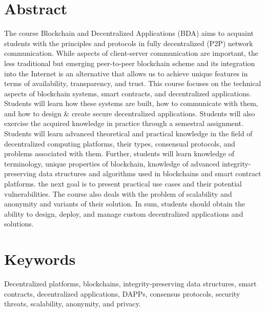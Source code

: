 \section*{Abstract}
The course Blockchain and Decentralized Applications (BDA) aims to acquaint students with the principles and protocols in fully decentralized (P2P) network communication. While aspects of client-server communication are important, the less traditional but emerging peer-to-peer blockchain scheme and its integration into the Internet is an alternative that allows us to achieve unique features in terms of availability, transparency, and trust. This course focuses on the technical aspects of blockchain systems, smart contracts, and decentralized applications. Students will learn how these systems are built, how to communicate with them, and how to design \& create secure decentralized applications. Students will also exercise the acquired knowledge in practice through a semestral assignment.
Students will learn advanced theoretical and practical knowledge in the field of decentralized computing platforms, their types, consensual protocols, and problems associated with them. Further, students will learn knowledge of terminology, unique properties of blockchain, knowledge of advanced integrity-preserving data structures and algorithms used in blockchains and smart contract platforms. the next goal is to present practical use cases and their potential vulnerabilities. The course also deals with the problem of scalability and anonymity and variants of their solution. In sum, students should obtain the ability to design, deploy, and manage custom decentralized applications and solutions.
\section*{Keywords}
Decentralized platforms, blockchains, integrity-preserving data structures, smart contracts, decentralized applications, DAPPs, consensus protocols, security threats, scalability, anonymity, and privacy.

